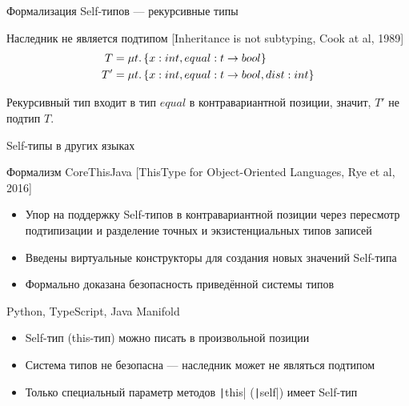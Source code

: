 \documentclass[aspectratio=169,usenames,dvipsnames]{beamer}
\begin{document}
\begin{frame}[fragile]{Формализация Self-типов --- рекурсивные типы}
        \begin{block}{Наследник не является подтипом [Inheritance is not subtyping, Cook at al, 1989]}
            \vspace{-1em}
            \begin{align*}
                T &= \mu t \ldotp \{ x : int, equal : t \to bool \} \\
                T' &= \mu t \ldotp \{ x : int, equal : t \to bool, dist : int \}
            \end{align*}

            Рекурсивный тип входит в тип $equal$ в контравариантной позиции, значит, $T'$ не подтип $T$.
        \end{block}
    \end{frame}

    \begin{frame}[fragile]{Self-типы в других языках}

        \begin{block}{Формализм CoreThisJava [ThisType for Object-Oriented Languages, Rye et al, 2016]}
            \begin{itemize}
                \item Упор на поддержку Self-типов в контравариантной позиции через пересмотр подтипизации и разделение точных и экзистенциальных типов записей
                \item Введены виртуальные конструкторы для создания новых значений Self-типа
                \item Формально доказана безопасность приведённой системы типов
            \end{itemize}
        \end{block}

        \begin{block}{Python, TypeScript, Java Manifold}
            \begin{itemize}
                \item Self-тип (this-тип) можно писать в произвольной позиции
                \item Система типов не безопасна --- наследник может не являться подтипом
                \item Только специальный параметр методов \texttt|this| (\texttt|self|) имеет Self-тип
            \end{itemize}
        \end{block}


\end{frame}
\end{document}

